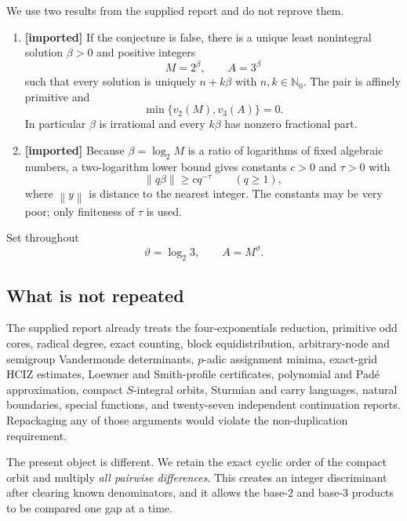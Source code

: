 \documentclass[11pt,oneside]{article}
\theoremstyle{definition}
\theoremstyle{remark}
\newcommand{\Nzero}{\mathbb N_0}
\newcommand{\norm}[1]{\left\lVert #1\right\rVert}
\newcommand{\vpp}[2]{v_{#1}\!\left(#2\right)}
\newcommand{\thetaq}{\vartheta}
\newcommand{\statusprior}{\textcolor{deepblue}{\textbf{[imported]}}}
\begin{document}
We use two results from the supplied report and do not reprove them.

\begin{enumerate}
\item \statusprior{} If the conjecture is false, there is a unique least nonintegral solution
$\beta>0$ and positive integers
\[
 M=2^\beta,\qquad A=3^\beta
\]
such that every solution is uniquely $n+k\beta$ with $n,k\in\Nzero$.  The pair is affinely
primitive and
\begin{equation}
 \min\{\vpp{2}{M},\vpp{3}{A}\}=0.
 \label{eq:primitive-depth}
\end{equation}
In particular $\beta$ is irrational and every $k\beta$ has nonzero fractional part.

\item \statusprior{} Because $\beta=\log_2 M$ is a ratio of logarithms of fixed algebraic
numbers, a two-logarithm lower bound gives constants $c>0$ and $\tau>0$ with
\begin{equation}
 \norm{q\beta}\ge c q^{-\tau}\qquad(q\ge1),
 \label{eq:finite-type}
\end{equation}
where $\norm{y}$ is distance to the nearest integer.  The constants may be very poor; only
finiteness of $\tau$ is used.
\end{enumerate}

Set throughout
\begin{equation}
 \thetaq=\log_2 3,
 \qquad A=M^{\thetaq}.
 \label{eq:theta}
\end{equation}

\subsection{What is not repeated}

The supplied report already treats the four-exponentials reduction, primitive odd cores,
radical degree, exact counting, block equidistribution, arbitrary-node and semigroup
Vandermonde determinants, $p$-adic assignment minima, exact-grid HCIZ estimates, Loewner and
Smith-profile certificates, polynomial and Pad\'e approximation, compact $S$-integral orbits,
Sturmian and carry languages, natural boundaries, special functions, and twenty-seven
independent continuation reports.  Repackaging any of those arguments would violate the
non-duplication requirement.

The present object is different.  We retain the exact cyclic order of the compact orbit and
multiply \emph{all pairwise differences}.  This creates an integer discriminant after clearing
known denominators, and it allows the base-$2$ and base-$3$ products to be compared one gap at
a time.
\end{document}
